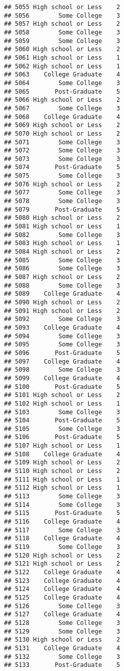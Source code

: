 \documentclass[
]{article}
\begin{document}
\begin{verbatim}
## 5055 High school or Less    2
## 5056        Some College    3
## 5057 High school or Less    2
## 5058        Some College    3
## 5059        Some College    3
## 5060 High school or Less    2
## 5061 High school or Less    1
## 5062 High school or Less    1
## 5063    College Graduate    4
## 5064        Some College    3
## 5065       Post-Graduate    5
## 5066 High school or Less    2
## 5067        Some College    3
## 5068    College Graduate    4
## 5069 High school or Less    2
## 5070 High school or Less    2
## 5071        Some College    3
## 5072        Some College    3
## 5073        Some College    3
## 5074       Post-Graduate    5
## 5075        Some College    3
## 5076 High school or Less    2
## 5077        Some College    3
## 5078        Some College    3
## 5079       Post-Graduate    5
## 5080 High school or Less    2
## 5081 High school or Less    1
## 5082        Some College    3
## 5083 High school or Less    1
## 5084 High school or Less    2
## 5085        Some College    3
## 5086        Some College    3
## 5087 High school or Less    2
## 5088        Some College    3
## 5089    College Graduate    4
## 5090 High school or Less    2
## 5091 High school or Less    2
## 5092        Some College    3
## 5093    College Graduate    4
## 5094        Some College    3
## 5095        Some College    3
## 5096       Post-Graduate    5
## 5097    College Graduate    4
## 5098        Some College    3
## 5099    College Graduate    4
## 5100       Post-Graduate    5
## 5101 High school or Less    2
## 5102 High school or Less    1
## 5103        Some College    3
## 5104       Post-Graduate    5
## 5105        Some College    3
## 5106       Post-Graduate    5
## 5107 High school or Less    1
## 5108    College Graduate    4
## 5109 High school or Less    2
## 5110 High school or Less    2
## 5111 High school or Less    1
## 5112 High school or Less    1
## 5113        Some College    3
## 5114        Some College    3
## 5115       Post-Graduate    5
## 5116    College Graduate    4
## 5117        Some College    3
## 5118    College Graduate    4
## 5119        Some College    3
## 5120 High school or Less    2
## 5121 High school or Less    2
## 5122    College Graduate    4
## 5123    College Graduate    4
## 5124    College Graduate    4
## 5125    College Graduate    4
## 5126        Some College    3
## 5127    College Graduate    4
## 5128        Some College    3
## 5129        Some College    3
## 5130 High school or Less    2
## 5131    College Graduate    4
## 5132        Some College    3
## 5133       Post-Graduate    5

\end{verbatim}
\end{document}
